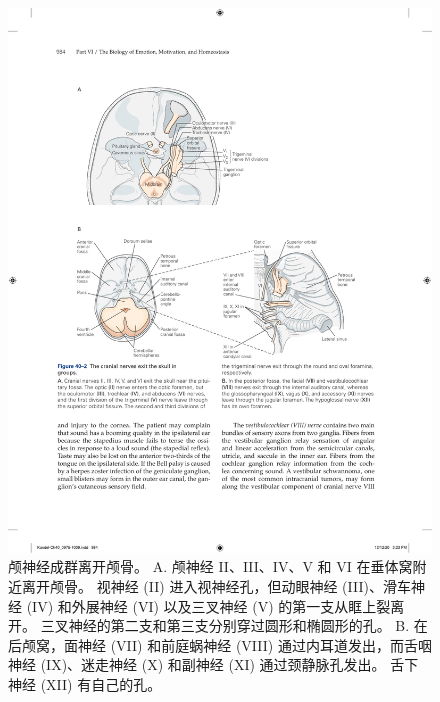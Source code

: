 \begin{figure}[htbp]
	\centering
	\includegraphics[width=0.85\linewidth]{chap40/fig_40_2}
	\caption{颅神经成群离开颅骨。 A. 颅神经 II、III、IV、V 和 VI 在垂体窝附近离开颅骨。 视神经 (II) 进入视神经孔，但动眼神经 (III)、滑车神经 (IV) 和外展神经 (VI) 以及三叉神经 (V) 的第一支从眶上裂离开。 三叉神经的第二支和第三支分别穿过圆形和椭圆形的孔。 B. 在后颅窝，面神经 (VII) 和前庭蜗神经 (VIII) 通过内耳道发出，而舌咽神经 (IX)、迷走神经 (X) 和副神经 (XI) 通过颈静脉孔发出。 舌下神经 (XII) 有自己的孔。}
	\label{fig:40_2}
\end{figure}

